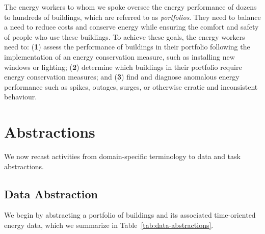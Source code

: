 \documentclass[journal]{vgtc}                %
\begin{document}
The energy workers to whom we spoke oversee the energy performance of dozens to hundreds of buildings, which are referred to as {\it portfolios}. 
They need to balance a need to reduce costs and conserve energy while ensuring the comfort and safety of people who use these buildings.
To achieve these goals, the energy workers need to: ({\bf 1}) assess the performance of buildings in their portfolio following the implementation of an energy conservation measure, such as installing new windows or lighting; ({\bf 2}) determine which buildings in their portfolio require energy conservation measures; and ({\bf 3}) find and diagnose anomalous energy performance such as spikes, outages, surges, or otherwise erratic and inconsistent behaviour.


\section{Abstractions}
\label{abstractions}


We now recast activities from domain-specific terminology to data and task abstractions.


\subsection{Data Abstraction}
\label{data-abstractions}


We begin by abstracting a portfolio of buildings and its associated time-oriented energy data, which we summarize in Table~\ref{tab:data-abstractions}.
\end{document}
